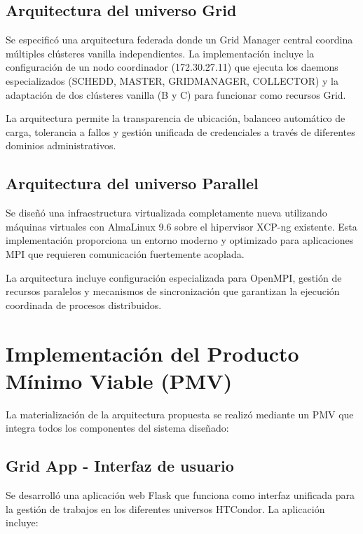 \subsection{Arquitectura del universo Grid}
\noindent

Se especificó una arquitectura federada donde un Grid Manager central coordina múltiples clústeres vanilla independientes. La implementación incluye la configuración de un nodo coordinador (172.30.27.11) que ejecuta los daemons especializados (SCHEDD, MASTER, GRIDMANAGER, COLLECTOR) y la adaptación de dos clústeres vanilla (B y C) para funcionar como recursos Grid.

La arquitectura permite la transparencia de ubicación, balanceo automático de carga, tolerancia a fallos y gestión unificada de credenciales a través de diferentes dominios administrativos.

\subsection{Arquitectura del universo Parallel}
\noindent

Se diseñó una infraestructura virtualizada completamente nueva utilizando máquinas virtuales con AlmaLinux 9.6 sobre el hipervisor XCP-ng existente. Esta implementación proporciona un entorno moderno y optimizado para aplicaciones MPI que requieren comunicación fuertemente acoplada.

La arquitectura incluye configuración especializada para OpenMPI, gestión de recursos paralelos y mecanismos de sincronización que garantizan la ejecución coordinada de procesos distribuidos.

\section{Implementación del Producto Mínimo Viable (PMV)}
\noindent

La materialización de la arquitectura propuesta se realizó mediante un PMV que integra todos los componentes del sistema diseñado:

\subsection{Grid App - Interfaz de usuario}
\noindent

Se desarrolló una aplicación web Flask que funciona como interfaz unificada para la gestión de trabajos en los diferentes universos HTCondor. La aplicación incluye:

